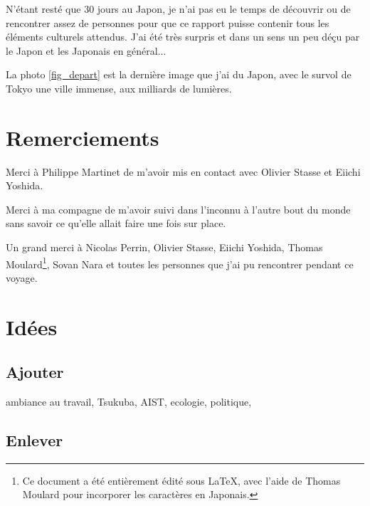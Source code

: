 \documentclass[journal]{RapportFR}
\begin{document}
\begin{CJK*}{UTF8}{min}
N'\'etant rest\'e que 30 jours au Japon, je n'ai pas eu le temps de d\'ecouvrir ou de rencontrer assez de personnes pour que ce rapport puisse contenir tous les \'el\'ements culturels attendus.
J'ai \'et\'e tr\`es surpris et dans un sens un peu d\'e\c cu par le Japon et les Japonais en g\'en\'eral...


La photo \ref{fig_depart} est la derni\`ere image que j'ai du Japon, avec le survol de Tokyo une ville immense, aux milliards de lumi\`eres.


\section*{Remerciements}


Merci \`a Philippe Martinet de m'avoir mis en contact avec Olivier Stasse et Eiichi Yoshida. 

Merci \`a ma compagne de m'avoir suivi dans l'inconnu \`a l'autre bout du monde sans savoir ce qu'elle allait faire une fois sur place.

Un grand merci à Nicolas Perrin, Olivier Stasse, Eiichi Yoshida, Thomas Moulard\footnote{Ce document a \'et\'e enti\`erement \'edit\'e sous \LaTeX, avec l'aide de Thomas Moulard pour incorporer les caract\`eres en Japonais.}, Sovan Nara et toutes les personnes que j'ai pu rencontrer pendant ce voyage.

\section*{Id\'ees}

\subsection{Ajouter}
ambiance au travail, 
Tsukuba, 
AIST, 
ecologie, 
politique, 

\subsection{Enlever}





\end{CJK*}
\end{document}
